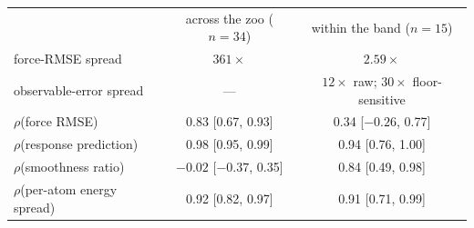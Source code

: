 \documentclass[aip,jcp,reprint,amsmath,amssymb,floatfix]{revtex4-2}
\begin{document}
\begin{table}[t]
\begin{ruledtabular}
\begin{tabular}{lcc}
 & across the zoo ($n = 34$) & within the band ($n = 15$) \\
\colrule
force-RMSE spread & $361\times$ & $2.59\times$ \\
observable-error spread & --- & $12\times$ raw; $30\times$ floor-sensitive \\
$\rho$(force RMSE) & 0.83 [0.67, 0.93] & 0.34 [$-0.26$, 0.77] \\
$\rho$(response prediction) & 0.98 [0.95, 0.99] & 0.94 [0.76, 1.00] \\
$\rho$(smoothness ratio) & $-0.02$ [$-0.37$, 0.35] & 0.84 [0.49, 0.98] \\
$\rho$(per-atom energy spread) & 0.92 [0.82, 0.97] & 0.91 [0.71, 0.99] \\
\end{tabular}
\end{ruledtabular}
\end{table}
\end{document}
